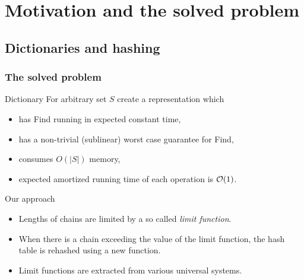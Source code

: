 \section{Motivation and the solved problem}
\subsection{Dictionaries and hashing}
\begin{frame}
	\frametitle{The solved problem}

	\begin{block}{Dictionary}
		For arbitrary set $S$ create a representation which
		\begin{itemize}
			\item has Find running in expected constant time,
			\item has a non-trivial (sublinear) worst case guarantee for Find,
			\item consumes $O(|S|)$ memory,
			\item expected amortized running time of each operation is $\mathcal{O}(1)$.
		\end{itemize}
	\end{block}

	\begin{block}{Our approach}
		\begin{itemize}
			\item Lengths of chains are limited by a so called \emph{limit function}.			
			\item When there is a chain exceeding the value of the limit function, the hash table is rehashed using a new function.
			\item Limit functions are extracted from various universal systems.
		\end{itemize}
	\end{block}
\end{frame}

